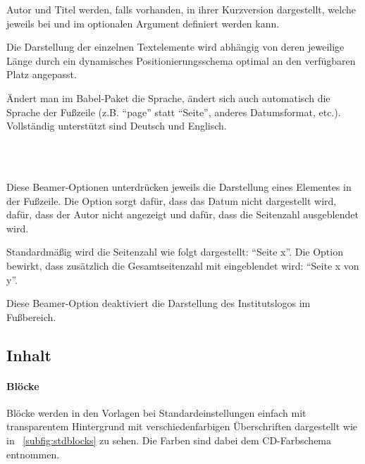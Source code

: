 Autor und Titel werden, falls vorhanden, in ihrer Kurzversion dargestellt,
welche jeweils bei  und  im optionalen Argument
definiert werden kann.

Die Darstellung der einzelnen Textelemente wird abhängig von deren
jeweilige Länge durch ein dynamisches Positionierungsschema optimal
an den verfügbaren Platz angepasst.

Ändert man im Babel-Paket die Sprache, ändert sich auch automatisch
die Sprache der Fußzeile (z.B. "`page"' statt "`Seite"', anderes Datumsformat, etc.).
Vollständig unterstützt sind Deutsch und Englisch.

\begin{Declaration}
  \\
  \\
\end{Declaration}

Diese Beamer-Optionen unterdrücken jeweils die Darstellung eines Elementes in der Fußzeile.
Die Option  sorgt dafür, dass das Datum nicht dargestellt wird,
 dafür, dass der Autor nicht angezeigt und
 dafür, dass die Seitenzahl ausgeblendet wird.

\begin{Declaration}
\end{Declaration}

Standardmäßig wird die Seitenzahl wie folgt dargestellt: "`Seite x"'.
Die Option  bewirkt, dass zusätzlich die Gesamtseitenzahl
mit eingeblendet wird: "`Seite x von y"'.

\begin{Declaration}
\end{Declaration}

Diese Beamer-Option deaktiviert die Darstellung des Institutslogos im Fußbereich.

\subsection{Inhalt}

\paragraph{Blöcke}

Blöcke werden in den Vorlagen bei Standardeinstellungen einfach
mit transparentem Hintergrund mit verschiedenfarbigen Überschriften dargestellt
wie in \figurename~\ref{subfig:stdblocks} zu sehen.
Die Farben sind dabei dem CD-Farbschema entnommen.

